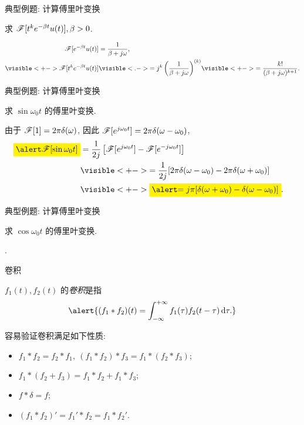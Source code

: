 \begin{frame}{典型例题: 计算傅里叶变换}
\begin{example}
求 $\mathscr{F}[t^k e^{-\beta t}u(t)],\beta>0$.
\end{example}
\begin{solution}
\vspace{-\baselineskip}
\begin{align*}
\msf[e^{-\beta t}u(t)]&=\frac{1}{\beta+j\omega},\\
\visible<+->{\msf[t^ke^{-\beta t}u(t)]}&\visible<.->{=j^k\left(\frac1{\beta+j\omega}\right)^{(k)}}
	\visible<+->{=\frac{k!}{(\beta+j\omega)^{k+1}}.}
\end{align*}
\end{solution}
\end{frame}


\begin{frame}{典型例题: 计算傅里叶变换}
\begin{example}
求 $\sin{\omega_0 t}$ 的傅里叶变换.
\end{example}
\begin{solution}
由于 $\mathscr{F}[1]=2\pi\delta(\omega)$,
\onslide<+->
因此 $\mathscr{F}[e^{j\omega_0t}]=2\pi\delta(\omega-\omega_0)$,
\onslide<+->
\begin{align*}
\aboxeq{\msf[\sin{\omega_0 t}]}&=\frac1{2j}\left[\msf[e^{j\omega_0t}]-\msf[e^{-j\omega_0t}]\right]&\\
&\visible<+->{=\frac1{2j}[2\pi\delta(\omega-\omega_0)-2\pi\delta(\omega+\omega_0)]}&\\
&\visible<+->{\aboxeq{=j\pi[\delta(\omega+\omega_0)-\delta(\omega-\omega_0)]}.}
\end{align*}
\end{solution}
\end{frame}


\begin{frame}{典型例题: 计算傅里叶变换}
\begin{exercise}
求 $\cos{\omega_0 t}$ 的傅里叶变换.
\end{exercise}
\begin{answer}
.
\end{answer}
\end{frame}


\begin{frame}{卷积}
\begin{definition}
$f_1(t),f_2(t)$ 的\emph{卷积}是指
\[\alert{(f_1\ast f_2)(t)=\int_{-\infty}^{+\infty} f_1(\tau)f_2(t-\tau)\diff \tau.}\]
\end{definition}
\onslide<+->
容易验证卷积满足如下性质:
\begin{itemize}
\item $f_1\ast f_2=f_2\ast f_1,\ (f_1\ast f_2)\ast f_3=f_1\ast(f_2\ast f_3)$;
\item $f_1\ast(f_2+f_3)=f_1\ast f_2+f_1\ast f_3$;
\item $f\ast\delta=f$;
\item $(f_1\ast f_2)'=f_1'\ast f_2=f_1\ast f_2'$.
\end{itemize}
\end{frame}


